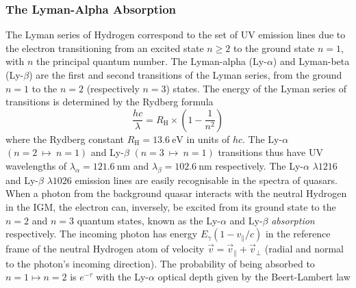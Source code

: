 \subsubsection{The Lyman-Alpha Absorption}

The Lyman series of Hydrogen correspond to the set of UV emission lines due to the electron transitioning from an excited state $n \geqslant 2$ to the ground state $n=1$, with $n$ the principal quantum number. The Lyman-alpha (Ly-$\alpha$) and Lyman-beta (Ly-$\beta$) are the first and second transitions of the Lyman series, from the ground $n=1$ to the $n=2$ (respectively $n=3$) states. The energy of the Lyman series of transitions is determined by the Rydberg formula
\begin{equation}
\label{eq:Rydberg}
\frac{h c}{\lambda} = R_{\mathrm{H}} \times  \left( 1 - \frac{1}{n^2} \right)
\end{equation} where the Rydberg constant $R_\mathrm{H} = 13.6~\mathrm{eV}$ in units of $hc$. The Ly-$\alpha$ $(n = 2 ~\mapsto~ n=1)$ and Ly-$\beta$ $(n = 3 ~\mapsto~ n=1)$ transitions thus have UV wavelengths of $\lambda_\alpha = 121.6~\mathrm{nm}$ and $\lambda_\beta = 102.6~\mathrm{nm}$ respectively. The Ly-$\alpha$ $\lambda 1216$ and Ly-$\beta$ $\lambda 1026$ emission lines are easily recognisable in the spectra of quasars. When a photon from the background quasar interacts with the neutral Hydrogen in the IGM, the electron can, inversely, be excited from its ground state to the $n=2$ and $n=3$ quantum states, known as the Ly-$\alpha$ and Ly-$\beta$ \emph{absorption} respectively. The incoming photon has energy $E_\gamma \left( 1 - v_\parallel / c \right)$ in the reference frame of the neutral Hydrogen atom of velocity $\vec{v} = \vec{v}_\parallel + \vec{v}_\perp$ (radial and normal to the photon's incoming direction). The probability of being absorbed to $n=1 \mapsto n=2$ is $e^{-\tau}$ with the Ly-$\alpha$ optical depth given by the Beert-Lambert law

